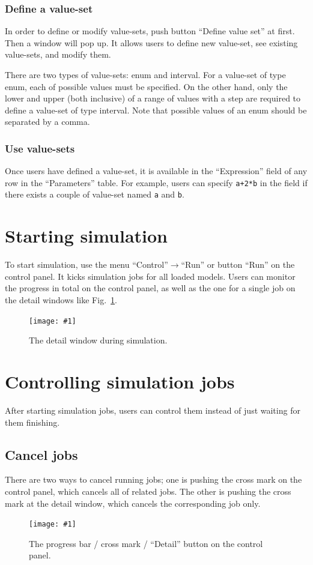 \documentclass[a4paper,10pt]{report}
\newcommand\FigureOfImage[2]{\begin{figure}[h]
  \centering
  \texttt{[image: \#1]}
  \caption{#2}\label{fig:#1}
\end{figure}}
\begin{document}
\subsubsection{Define a value-set}
In order to define or modify value-sets, push button ``Define value set'' at
first. Then a window will pop up. It allows users to define new value-set,
see existing value-sets, and modify them.

There are two types of value-sets: enum and interval. For a value-set of type
enum, each of possible values must be specified. On the other hand, only the
lower and upper (both inclusive) of a range of values with a step are required
to define a value-set of type interval.
Note that possible values of an enum should be separated by a comma.

\subsubsection{Use value-sets}
Once users have defined a value-set, it is available in the ``Expression''
field of any row in the ``Parameters'' table. For example, users can specify
{\tt a+2*b} in the field if there exists a couple of value-set named {\tt a} and
{\tt b}.

\section{Starting simulation}
To start simulation, use the menu ``Control''$\rightarrow$``Run'' or button
``Run'' on the control panel. It kicks simulation jobs for all loaded models.
Users can monitor the progress in total on the control panel, as well as the
one for a single job on the detail windows like Fig.~\ref{fig:lr-detail}.
\FigureOfImage{lr-detail}{The detail window during simulation.}

\section{Controlling simulation jobs}
After starting simulation jobs, users can control them instead of just waiting
for them finishing.

\subsection{Cancel jobs}
There are two ways to cancel running jobs; one is pushing the cross mark on
the control panel, which cancels all of related jobs. The other is pushing 
the cross mark at the detail window, which cancels the corresponding job only.
\FigureOfImage{lr-progress}{The progress bar / cross mark / ``Detail'' button on
the control panel.}
\end{document}
